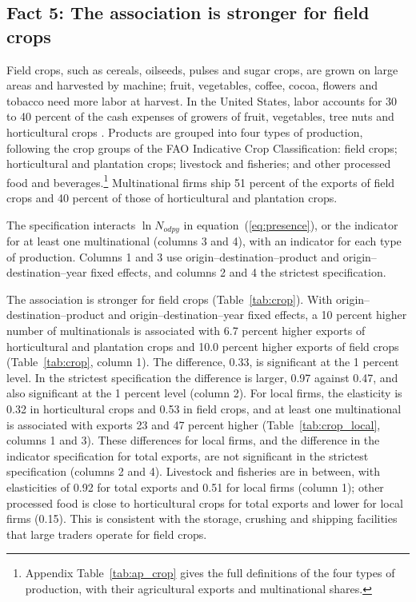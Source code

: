 \FloatBarrier
\subsection{Fact 5: The association is stronger for field crops}

Field crops, such as cereals, oilseeds, pulses and sugar crops, are grown on large areas and harvested by
machine; fruit, vegetables, coffee, cocoa, flowers and tobacco need more labor at harvest. In the United
States, labor accounts for 30 to 40 percent of the cash expenses of growers of fruit, vegetables, tree nuts and
horticultural crops \citep{kandel2008}. Products are grouped into four types of production, following the crop groups
of the FAO Indicative Crop Classification: field crops; horticultural and plantation crops; livestock and fisheries;
and other processed food and beverages.\footnote{Appendix Table~\ref{tab:ap_crop} gives the full definitions of the four types of production, with their agricultural exports and multinational shares.} Multinational firms ship 51 percent of the exports of field crops
and 40 percent of those of horticultural and plantation crops.

The specification interacts $\ln N_{odpy}$ in equation~(\ref{eq:presence}), or the indicator for at least one multinational
(columns 3 and 4), with an indicator for each type of production. Columns 1 and 3 use origin--destination--product and
origin--destination--year fixed effects, and columns 2 and 4 the strictest specification.

The association is stronger for field crops (Table~\ref{tab:crop}).
With origin--destination--product and origin--destination--year fixed effects, a 10 percent higher number of
multinationals is associated with 6.7 percent higher exports of horticultural and plantation crops and 10.0 percent
higher exports of field crops (Table~\ref{tab:crop}, column 1). The difference, 0.33, is significant at the 1 percent level. In
the strictest specification the difference is larger, 0.97 against 0.47, and also significant at the 1 percent
level (column 2). For local firms, the elasticity is 0.32 in horticultural crops and 0.53 in field crops, and at
least one multinational is associated with exports 23 and 47 percent higher (Table~\ref{tab:crop_local}, columns 1 and 3). These
differences for local firms, and the difference in the indicator specification for total exports, are not
significant in the strictest specification (columns 2 and 4). Livestock and fisheries are in between, with
elasticities of 0.92 for total exports and 0.51 for local firms (column 1); other processed food is close to
horticultural crops for total exports and lower for local firms (0.15). This is consistent with the storage,
crushing and shipping facilities that large traders operate for field crops.

